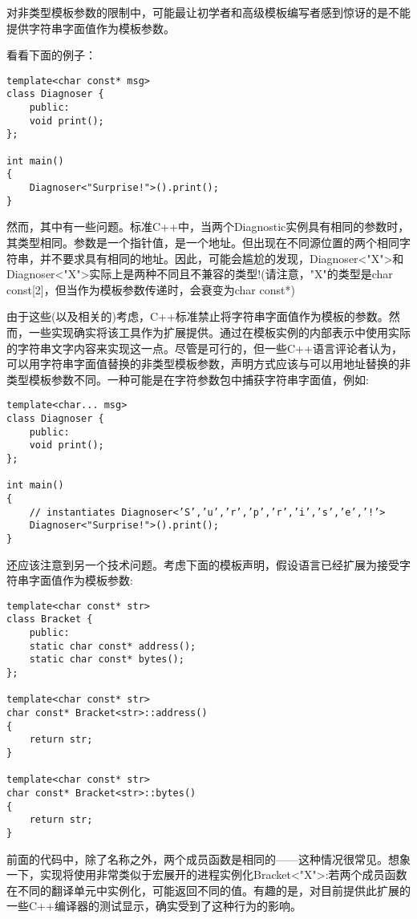 对非类型模板参数的限制中，可能最让初学者和高级模板编写者感到惊讶的是不能提供字符串字面值作为模板参数。

看看下面的例子：

\begin{lstlisting}[style=styleCXX]
template<char const* msg>
class Diagnoser {
	public:
	void print();
};

int main()
{
	Diagnoser<"Surprise!">().print();
}
\end{lstlisting}

然而，其中有一些问题。标准C++中，当两个Diagnostic实例具有相同的参数时，其类型相同。参数是一个指针值，是一个地址。但出现在不同源位置的两个相同字符串，并不要求具有相同的地址。因此，可能会尴尬的发现，Diagnoser<"X">和Diagnoser<"X">实际上是两种不同且不兼容的类型!(请注意，"X"的类型是char const[2]，但当作为模板参数传递时，会衰变为char const*)

由于这些(以及相关的)考虑，C++标准禁止将字符串字面值作为模板的参数。然而，一些实现确实将该工具作为扩展提供。通过在模板实例的内部表示中使用实际的字符串文字内容来实现这一点。尽管是可行的，但一些C++语言评论者认为，可以用字符串字面值替换的非类型模板参数，声明方式应该与可以用地址替换的非类型模板参数不同。一种可能是在字符参数包中捕获字符串字面值，例如:

\begin{lstlisting}[style=styleCXX]
template<char... msg>
class Diagnoser {
	public:
	void print();
};

int main()
{
	// instantiates Diagnoser<’S’,’u’,’r’,’p’,’r’,’i’,’s’,’e’,’!’>
	Diagnoser<"Surprise!">().print();
}
\end{lstlisting}

还应该注意到另一个技术问题。考虑下面的模板声明，假设语言已经扩展为接受字符串字面值作为模板参数:

\begin{lstlisting}[style=styleCXX]
template<char const* str>
class Bracket {
	public:
	static char const* address();
	static char const* bytes();
};

template<char const* str>
char const* Bracket<str>::address()
{
	return str;
}

template<char const* str>
char const* Bracket<str>::bytes()
{
	return str;
}
\end{lstlisting}

前面的代码中，除了名称之外，两个成员函数是相同的——这种情况很常见。想象一下，实现将使用非常类似于宏展开的进程实例化Bracket<"X">:若两个成员函数在不同的翻译单元中实例化，可能返回不同的值。有趣的是，对目前提供此扩展的一些C++编译器的测试显示，确实受到了这种行为的影响。

